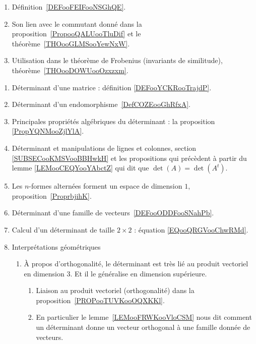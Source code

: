     \begin{enumerate}
        \item
            Définition~\ref{DEFooFEIFooNSGhQE}.
        \item
            Son lien avec le commutant donné dans la proposition~\ref{PropooQALUooTluDif} et le théorème~\ref{THOooGLMSooYewNxW}.
        \item
            Utilisation dans le théorème de Frobenius (invariants de similitude), théorème~\ref{THOooDOWUooOzxzxm}.
        \end{enumerate}


     \label{THMooUXJMooOroxbI}
    \begin{enumerate}
        \item
            Déterminant d'une matrice : définition \ref{DEFooYCKRooTrajdP}.
    \item
        Déterminant d'un endomorphisme~\ref{DefCOZEooGhRfxA}. 
    \item
        Principales propriétés algébriques du déterminant : la proposition \ref{PropYQNMooZjlYlA}.
        \item
            Déterminant et manipulations de lignes et colonnes, section \ref{SUBSECooKMSVooBBHwkH} et les propositions qui précèdent à partir du lemme \ref{LEMooCEQYooYAbctZ} qui dit que \( \det(A)=\det(A^t)\).
    \item
        Les \( n\)-formes alternées forment un espace de dimension \( 1\), proposition~\ref{ProprbjihK}.
    \item
        Déterminant d'une famille de vecteurs~\ref{DEFooODDFooSNahPb}.
    \item
        Calcul d'un déterminant de taille \( 2\times 2\) : équation \eqref{EQooQRGVooChwRMd}.
    \item
        Interprétations géométriques
            \begin{enumerate}
        \item
            À propos d'orthogonalité, le déterminant est très lié au produit vectoriel en dimension \( 3\). Et il le généralise en dimension supérieure.
            \begin{enumerate}
                \item
            Liaison au produit vectoriel (orthogonalité) dans la proposition~\ref{PROPooTUVKooOQXKKl}.
        \item
            En particulier le lemme~\ref{LEMooFRWKooVloCSM} nous dit comment un déterminant donne un vecteur orthogonal à une famille donnée de vecteurs.

\end{enumerate}
\end{enumerate}
\end{enumerate}
